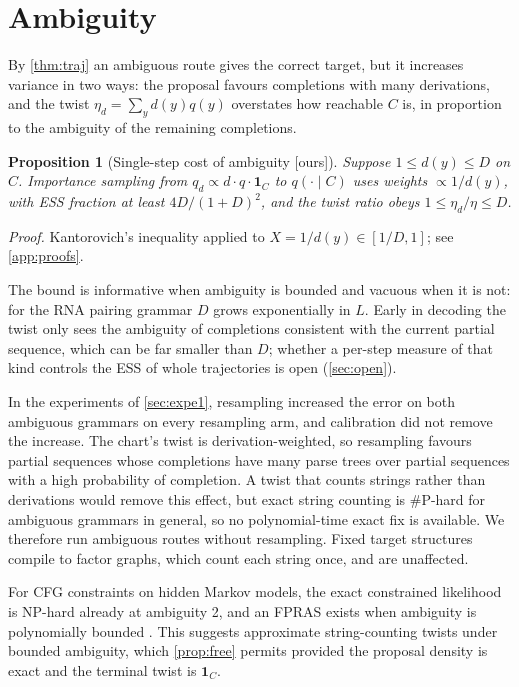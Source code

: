\documentclass[11pt]{article}
\newtheorem{proposition}[theorem]{Proposition}
\theoremstyle{definition}
\newcommand{\one}{\mathbf{1}}
\newcommand{\status}[1]{\textsf{\small[#1]}}
\newcommand{\proofref}[1]{\par\noindent\textit{Proof.} #1\par\smallskip}
\begin{document}
\section{Ambiguity}\label{sec:ambiguity}

By \cref{thm:traj} an ambiguous route gives the correct target, but it increases variance in two ways: the
proposal favours completions with many derivations, and the twist $\eta_d=\sum_yd(y)q(y)$ overstates how
reachable $C$ is, in proportion to the ambiguity of the remaining completions.

\begin{proposition}[Single-step cost of ambiguity \status{ours}]\label{prop:amb}
Suppose $1\le d(y)\le D$ on $C$. Importance sampling from $q_d\propto d\cdot q\cdot\one_C$ to $q(\cdot\mid C)$ uses
weights $\propto1/d(y)$, with ESS fraction at least $4D/(1+D)^2$, and the twist ratio obeys $1\le\eta_d/\eta\le D$.
\end{proposition}
\proofref{Kantorovich's inequality applied to $X=1/d(y)\in[1/D,1]$; see \cref{app:proofs}.}

The bound is informative when ambiguity is bounded and vacuous when it is not: for the RNA pairing grammar $D$
grows exponentially in $L$. Early in decoding the twist only sees the ambiguity of completions consistent with the
current partial sequence, which can be far smaller than $D$; whether a per-step measure of that kind controls the
ESS of whole trajectories is open (\cref{sec:open}).

In the experiments of \cref{sec:expe1}, resampling increased the error on both ambiguous grammars on every
resampling arm, and calibration did not remove the increase. The chart's twist is derivation-weighted, so
resampling favours partial sequences whose completions have many parse trees over partial sequences with a high
probability of completion. A twist that counts strings rather than derivations would remove this effect, but
exact string counting is \#P-hard for ambiguous grammars in general, so no polynomial-time exact fix is available.
We therefore run ambiguous routes without resampling. Fixed target structures compile to factor graphs, which
count each string once, and are unaffected.

For CFG constraints on hidden Markov models, the exact constrained likelihood is NP-hard already at ambiguity 2,
and an FPRAS exists when ambiguity is polynomially bounded \cite{marzouk2022}. This suggests approximate
string-counting twists under bounded ambiguity, which \cref{prop:free} permits provided the proposal density is
exact and the terminal twist is $\one_C$.
\end{document}

